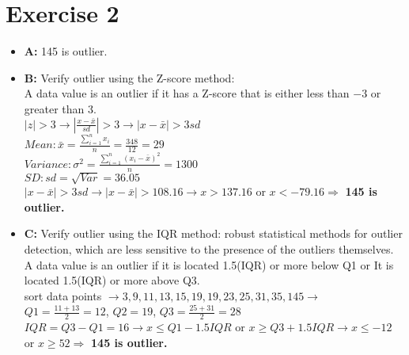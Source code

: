 \documentclass[12pt]{article}
\begin{document}
	\section{Exercise 2}
		\begin{itemize}
			\item \textbf{A:} 145 is outlier. 						
			
			\item \textbf{B:} Verify outlier using the Z-score method: \\
			A data value is an outlier if it has a Z-score that is either less than $-3$ or greater than 3. \\
			$|z| > 3 \rightarrow |\frac{x-\bar{x}}{sd}|>3 \rightarrow |x-\bar{x}|>3 sd$ \\
			$Mean: \bar{x}=\frac{\sum_{i=1}^{n} x_i}{n}=\frac{348}{12}=29$\\
			$Variance: \sigma^2=\frac{\sum_{i=1}^{n} (x_i -\bar{x})^2}{n}=1300$\\
			$SD: sd=\sqrt{Var}=36.05$\\
			
			$|x-\bar{x}|>3 sd \rightarrow |x-\bar{x}|>108.16 \rightarrow x>137.16$ or $x<-79.16 \Rightarrow$ \textbf{145 is outlier.} \\
			
			\item \textbf{C:} Verify outlier using the IQR method: robust statistical methods for
			outlier detection, which are less sensitive to the presence of the outliers themselves.\\
			A data value is an outlier if it is located 1.5(IQR) or more below Q1 or It is located 1.5(IQR) or more above Q3.\\
			sort data points $\rightarrow 3,9,11,13,15,19,19,23,25,31,35,145 \rightarrow$ \\ $Q1=\frac{11+13}{2}=12$, $Q2=19$, $Q3=\frac{25+31}{2}=28$ \\
			$IQR=Q3-Q1=16 \rightarrow x \leq Q1-1.5IQR$ or $x \geq Q3+1.5IQR \rightarrow x \leq-12$ or $x \geq 52 \Rightarrow$ \textbf{145 is outlier.}
		\end{itemize}
		
\end{document}
